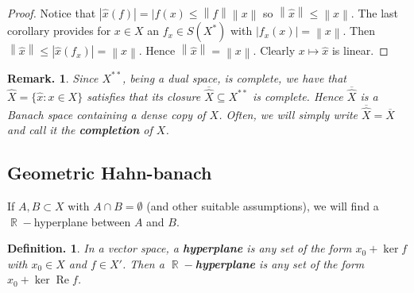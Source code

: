 \documentclass[11pt, a4paper]{memoir}
\DeclareMathOperator{\R}{{\mathbb{R}}}
\newcommand{\norm}[1]{\ensuremath{\left\lVert#1\right\rVert}}
\theoremstyle{change}
\theoremstyle{plain}
\theoremstyle{nonumberplain}
\newtheorem{definition}{Definition.}
\newtheorem{remark}{Remark.}
\newtheorem{proof}{Proof}
\renewcommand{\Re}{\ensuremath{\operatorname{Re}}}
\numberwithin{equation}{section}
\begin{document}
\begin{proof}
    Notice that $|\hat x(f)|=|f(x)\leq\norm{f}\norm{x}$ so $\norm{\hat x}\leq\norm{x}$.
    The last corollary provides for $x\in X$ an $f_x\in S(X^*)$ with $|f_x(x)|=\norm{x}$.
    Then $\norm{\hat x}\leq|\hat x(f_x)|=\norm{x}$.
    Hence $\norm{\hat x}=\norm{x}$.
    Clearly $x\mapsto\hat x$ is linear.
\end{proof}
\begin{remark}
    Since $X^{**}$, being a dual space, is complete, we have that $\hat X=\{\hat x:x\in X\}$ satisfies that its closure $\overline{\hat X}\subseteq X^{**}$ is complete.
    Hence $\overline{\hat X}$ is a Banach space containing a dense copy of $X$.
    Often, we will simply write $\overline{\hat X}=\overline{X}$ and call it the \textbf{completion} of $X$.
\end{remark}
\subsection{Geometric Hahn-banach}
If $A,B\subset X$ with $A\cap B=\emptyset$ (and other suitable assumptions), we will find a $\R-$hyperplane between $A$ and $B$.
\begin{definition}
    In a vector space, a \textbf{hyperplane} is any set of the form $x_0+\ker f$ with $x_0\in X$ and $f\in X'$.
    Then a \textbf{$\R-$hyperplane} is any set of the form $x_0+\ker\Re f$.
\end{definition}
\end{document}
